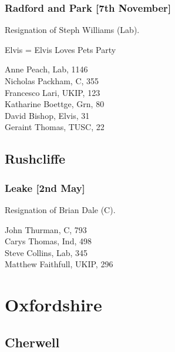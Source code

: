 \documentclass[a4paper,openany,10pt]{book}
\begin{document}
\subsubsection*{Radford and Park \hspace*{\fill}\nolinebreak[1]%
\enspace\hspace*{\fill}
[7th November]}


Resignation of Steph Williams (Lab).

Elvis = Elvis Loves Pets Party



Anne Peach, Lab, 1146\\
Nicholas Packham, C, 355\\
Francesco Lari, UKIP, 123\\
Katharine Boettge, Grn, 80\\
David Bishop, Elvis, 31\\
Geraint Thomas, TUSC, 22\\


\subsection*{Rushcliffe}

\subsubsection*{Leake \hspace*{\fill}\nolinebreak[1]%
\enspace\hspace*{\fill}
[2nd May]}


Resignation of Brian Dale (C).



John Thurman, C, 793\\
Carys Thomas, Ind, 498\\
Steve Collins, Lab, 345\\
Matthew Faithfull, UKIP, 296\\


\vfill

\section{Oxfordshire}

\subsection*{Cherwell}
\end{document}
